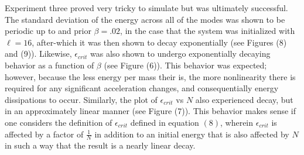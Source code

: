\documentclass[twocolumn]{article}
\begin{document}
Experiment three proved very tricky to simulate but was ultimately successful. The standard deviation of the energy across all of the modes was shown to be periodic up to and prior $\beta=.02$, in the case that the system was initialized with $\ell=16$, after-which it was then shown to decay exponentially (see Figures (8) and (9)). Likewise, $\epsilon_{crit}$ was also shown to undergo exponentially decaying behavior as a function of $\beta$ (see Figure (6)). This behavior was expected; however, because the less energy per mass their is, the more nonlinearity there is required for any significant acceleration changes, and consequentially energy dissipations to occur. Similarly, the plot of $\epsilon_{crit}$ vs $N$ also experienced decay, but in an approximately linear manner (see Figure (7)). This behavior makes sense if one considers the definition of $\epsilon_{crit}$ defined in equation $(8)$, wherein $\epsilon_{crit}$ is affected by a factor of $\frac{1}{N}$ in addition to an initial energy that is also affected by $N$ in such a way that the result is a nearly linear decay.
\end{document}

